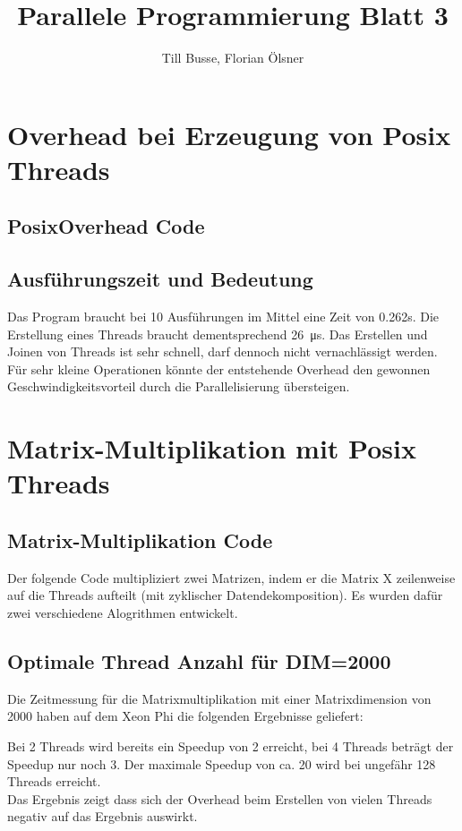 \documentclass[12pt,a4paper]{article}
\author{Till Busse, Florian Ölsner}
\title{Parallele Programmierung Blatt 3}
\begin{document}
\maketitle
\pagebreak
\section{Overhead bei Erzeugung von Posix Threads}
\subsection{PosixOverhead Code}
\lstset{escapechar=@,style=customc}

\subsection{Ausführungszeit und Bedeutung}
Das Program braucht bei 10 Ausführungen im Mittel eine Zeit von 0.262s. Die Erstellung eines Threads braucht dementsprechend \SI{26}{\micro\second}. Das Erstellen und Joinen von Threads ist sehr schnell, darf dennoch nicht vernachlässigt werden. Für sehr kleine Operationen könnte der entstehende Overhead den gewonnen Geschwindigkeitsvorteil durch die Parallelisierung übersteigen.
\pagebreak
\section{Matrix-Multiplikation mit Posix Threads}
\subsection{Matrix-Multiplikation Code}
Der folgende Code multipliziert zwei Matrizen, indem er die Matrix X zeilenweise auf die Threads aufteilt (mit zyklischer Datendekomposition). Es wurden dafür zwei verschiedene Alogrithmen entwickelt. 


\subsection{Optimale Thread Anzahl für DIM=2000}
Die Zeitmessung für die Matrixmultiplikation mit einer Matrixdimension von 2000 haben auf dem Xeon Phi die folgenden Ergebnisse geliefert:

Bei 2 Threads wird bereits ein Speedup von 2 erreicht, bei 4 Threads beträgt der Speedup nur noch 3. Der maximale Speedup von ca. 20 wird bei ungefähr 128 Threads erreicht.\\
Das Ergebnis zeigt dass sich der Overhead beim Erstellen von vielen Threads negativ auf das Ergebnis auswirkt.
\end{document}
